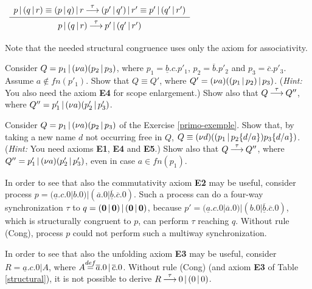 \begin{example}
\begin{center}
$\begin{array}{lcllcl}
\bigfrac{p \para (q \para r)  \equiv (p \para q)  \para r   \deriv{\tau}  (p' \para q') \para r' \equiv p' \para (q' \para r')}
{p \para (q \para r) \deriv{\tau}  p' \para (q' \para r')} \\
\end{array}$
\end{center}

\noindent
Note that the needed structural congruence uses only the axiom for associativity.
\fine
\end{example}

\begin{exercise}\label{primo-exemple}
Consider $Q = p_1 \mbox{$\,|\,$} \mbox{$({\bf\nu} a)$}(p_2 \mbox{$\,|\,$} p_3)$, where $p_1 = \underline{b}.c.p'_1$, $p_2 = \overline{b}.p'_2$ 
and $p_3 = \overline{c}.p'_3$. Assume $a \not\in fn(p'_1)$. Show that $Q \equiv Q'$, 
where $Q' = \mbox{$({\bf\nu} a)$}((p_1 \mbox{$\,|\,$} p_2) \mbox{$\,|\,$} p_3)$.
({\em Hint:} You also need the axiom {\bf E4} for scope enlargement.) 
Show also that $Q {\mbox{${\:\stackrel{\tau}{\longrightarrow}\:}$}} Q''$, where $Q'' =  p'_1 \mbox{$\,|\,$} \mbox{$({\bf\nu} a)$}(p'_2 \mbox{$\,|\,$} p'_3)$.
\fine
\end{exercise}

\begin{exercise}
Consider $Q = p_1 \mbox{$\,|\,$} \mbox{$({\bf\nu} a)$}(p_2 \mbox{$\,|\,$} p_3)$ of the Exercise \ref{primo-exemple}. Show that, by taking a new name $d$
not occurring free in $Q$, $Q \equiv \mbox{$({\bf\nu} d)$}((p_1 \mbox{$\,|\,$} p_2\mbox{$\{d/a\}$}) p_3\mbox{$\{d/a\}$})$.
({\em Hint:} You need axioms {\bf E1}, {\bf E4} and {\bf E5}.) 
Show also that $Q {\mbox{${\:\stackrel{\tau}{\longrightarrow}\:}$}} Q''$, where $Q'' =  p'_1 \mbox{$\,|\,$} \mbox{$({\bf\nu} a)$}(p'_2 \mbox{$\,|\,$} p'_3)$, even in case $a \in fn(p_1)$.
\fine
\end{exercise}


\begin{example}\label{comm-needed}
In order to see that also the commutativity axiom {\bf E2} may be useful, consider process $p = 
 (\underline{a}.c.0 | b.0) | (\overline{a}.0 | \underline{\overline{b}}.\overline{c}.0)$. Such a process
 can do a four-way synchronization $\tau$ to $q = (\mbox{\bf 0} \mbox{$\,|\,$} \mbox{\bf 0}) \mbox{$\,|\,$} (\mbox{\bf 0} \mbox{$\,|\,$} \mbox{\bf 0})$, because $p' = 
 (\underline{a}.c.0 | \overline{a}.0) | (b.0 | \underline{\overline{b}}.\overline{c}.0)$, which is structurally 
 congruent to $p$, can perform $\tau$ reaching $q$.
Without rule (Cong), process $p$ could not perform such a multiway synchronization.
\fine
\end{example}

\begin{example}\label{ax-cons-needed}
In order to see that also the unfolding axiom {\bf E3} may be useful, 
consider $R = \underline{a}.c.0 | A$, where $A {\mbox{${\stackrel{def}{=}}$}} \overline{a}.0 \mbox{$\,|\,$} \overline{c}.0$. Without rule (Cong) 
(and axiom {\bf E3} of Table \ref{structural}),
it is not possible to derive $R {\mbox{${\:\stackrel{\tau}{\longrightarrow}\:}$}} 0 \mbox{$\,|\,$} (0 \mbox{$\,|\,$} 0)$. 
\fine
\end{example}


